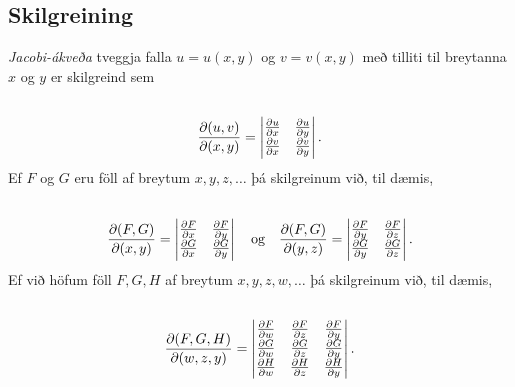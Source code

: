 \documentclass[a4paper,10pt,icelandic]{sphinxmanual}
\begin{document}
\subsection{Skilgreining}
\label{Kafli2:index-26}\label{Kafli2:id50}
\emph{Jacobi-ákveða} tveggja falla \(u=u(x,y)\) og \(v=v(x,y)\) með
tilliti til breytanna \(x\) og \(y\) er skilgreind sem
\begin{gather}
\begin{split}\displaystyle\end{split}\notag\\\begin{split}\frac{\partial(u,v)}{\partial(x,y)}=
\begin{vmatrix}
\frac{\partial u}{\partial x}&\frac{\partial u}{\partial y}\\
\frac{\partial v}{\partial x}&\frac{\partial v}{\partial y}
\end{vmatrix}.\end{split}\notag
\end{gather}
Ef \(F\) og \(G\) eru föll af breytum \(x,y,z,\ldots\) þá
skilgreinum við, til dæmis,
\begin{gather}
\begin{split}\displaystyle\end{split}\notag\\\begin{split}\frac{\partial(F,G)}{\partial(x,y)}=
\begin{vmatrix}
\frac{\partial F}{\partial x}&\frac{\partial F}{\partial y}\\
\frac{\partial G}{\partial x}&\frac{\partial G}{\partial y}
\end{vmatrix}\quad \mbox{og}\quad
\frac{\partial(F,G)}{\partial(y,z)}=
\begin{vmatrix}
\frac{\partial F}{\partial y}&\frac{\partial F}{\partial z}\\
\frac{\partial G}{\partial y}&\frac{\partial G}{\partial z}
\end{vmatrix}.\end{split}\notag
\end{gather}
Ef við höfum föll \(F, G, H\) af breytum \(x,y,z,w,\ldots\) þá
skilgreinum við, til dæmis,
\begin{gather}
\begin{split}\displaystyle\end{split}\notag\\\begin{split}\frac{\partial(F,G,H)}{\partial(w,z,y)}=
\begin{vmatrix}
\frac{\partial F}{\partial w}&\frac{\partial F}{\partial z}
&\frac{\partial F}{\partial y}\\
\frac{\partial G}{\partial w}&\frac{\partial G}{\partial z}
&\frac{\partial G}{\partial y}\\
\frac{\partial H}{\partial w}&\frac{\partial H}{\partial z}
&\frac{\partial H}{\partial y}
\end{vmatrix}.\end{split}\notag
\end{gather}
\end{document}
